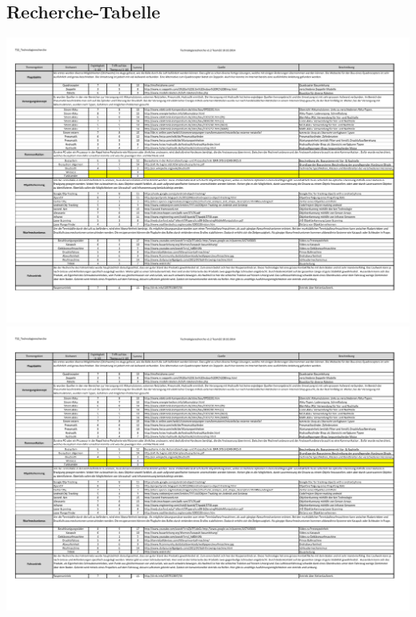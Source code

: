 \begin{landscape}
	\section{Recherche-Tabelle}	
		\includegraphics[page=1,scale=0.755,clip,trim=6mm 22mm 11mm 18mm]{Recherche/Extern/Produktrecherche.pdf}
		\includegraphics[page=2,scale=0.755,clip,trim=6mm 22mm 11mm 18mm]{Recherche/Extern/Produktrecherche.pdf}
\end{landscape} 